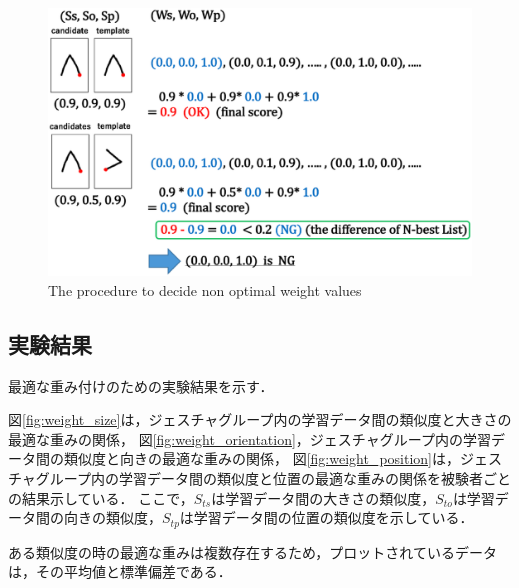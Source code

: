 \begin{figure} [h!]
	\begin{center}
		\includegraphics [width=0.8\hsize ]{img/weight_method2.eps}
	\end{center}
	\caption{The procedure to decide non optimal weight values}
	\label{fig:weight_method2}
\end{figure}

\subsection{実験結果}
最適な重み付けのための実験結果を示す．

図\ref{fig:weight_size}は，ジェスチャグループ内の学習データ間の類似度と大きさの最適な重みの関係，
図\ref{fig:weight_orientation}，ジェスチャグループ内の学習データ間の類似度と向きの最適な重みの関係，
図\ref{fig:weight_position}は，ジェスチャグループ内の学習データ間の類似度と位置の最適な重みの関係を被験者ごとの結果示している．
ここで，$S_\textit{ts}$は学習データ間の大きさの類似度，$S_\textit{to}$は学習データ間の向きの類似度，$S_\textit{tp}$は学習データ間の位置の類似度を示している．

ある類似度の時の最適な重みは複数存在するため，プロットされているデータは，その平均値と標準偏差である．

